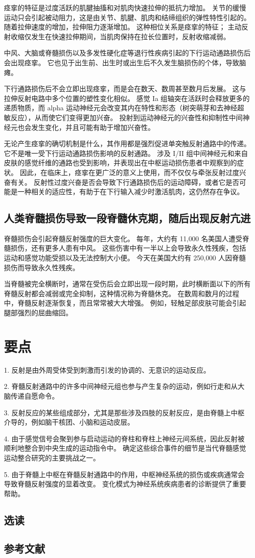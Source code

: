 痉挛的特征是过度活跃的肌腱抽搐和对肌肉快速拉伸的抵抗力增加。 关节的缓慢运动只会引起被动阻力，这是由关节、肌腱、肌肉和结缔组织的弹性特性引起的。 随着拉伸速度的增加，拉伸阻力逐渐增加。 这种相位关系是痉挛的特征； 主动反射收缩仅发生在快速拉伸期间，当肌肉保持在拉长位置时，反射收缩减弱。

中风、大脑或脊髓损伤以及多发性硬化症等退行性疾病引起的下行运动通路损伤后会出现痉挛。 它也见于出生前、出生时或出生后不久发生脑损伤的个体，导致脑瘫。

下行通路损伤后不会立即出现痉挛，而是会在数天、数周甚至数月后发展。 这与拉伸反射电路中多个位置的塑性变化相似。 感觉 Ia 组轴突在活跃时会释放更多的递质物质，而 alpha 运动神经元会改变其内在特性和形态（树突萌芽和去神经超敏反应），从而使它们变得更加兴奋。 投射到运动神经元的兴奋性和抑制性中间神经元也会发生变化，并且可能有助于增加兴奋性。

无论产生痉挛的确切机制是什么，其作用都是强烈促进单突触反射通路中的传递。 它不是唯一受下行运动通路损伤影响的反射通路。 涉及 I/II 组中间神经元和来自皮肤的感觉纤维的通路也受到影响，并表现出在中枢运动损伤患者中观察到的症状。 因此，在临床上，痉挛在更广泛的意义上使用，而不仅仅与牵张反射过度兴奋有关。 反射性过度兴奋是否会导致下行通路损伤后的运动障碍，或者它是否可能是一种相关的适应性，有助于在下行输入减少时激活肌肉，这仍然存在争议。

\subsection{人类脊髓损伤导致一段脊髓休克期，随后出现反射亢进}

脊髓损伤会引起脊髓反射强度的巨大变化。 每年，大约有 11,000 名美国人遭受脊髓损伤，还有更多人患有中风。 这些伤害中有一半以上会导致永久性残疾，包括运动和感觉功能受损以及无法控制大小便。 今天在美国大约有 250,000 人因脊髓损伤而导致永久性残疾。

当脊髓被完全横断时，通常在受伤后会立即出现一段时期，此时横断面以下的所有脊髓反射都会减弱或完全抑制，这种情况称为脊髓休克。 在数周和数月的过程中，脊髓反射逐渐恢复，而且常常被大大增强。 例如，轻触足部皮肤可能会引起腿部强烈的屈曲缩回。


\section{要点}
1. 反射是由外周受体受到刺激而引发的协调的、无意识的运动反应。 

2. 脊髓反射通路中的许多中间神经元组也参与产生复杂的运动，例如行走和从大脑传递自愿命令。 

3. 反射反应的某些组成部分，尤其是那些涉及四肢的反射反应，是由脊髓上中枢介导的，例如脑干核团、小脑和运动皮层。 

4. 由于感觉信号会聚到参与启动运动的脊柱和脊柱上神经元间系统，因此反射被顺利地整合到中央生成的运动指令中。 确定这些综合事件的细节是当代脊髓感觉运动整合研究的主要挑战之一。 

5. 由于脊髓上中枢在脊髓反射通路中的作用，中枢神经系统的损伤或疾病通常会导致脊髓反射强度的显着改变。 变化模式为神经系统疾病患者的诊断提供了重要帮助。

\subsection{选读}
\subsection{参考文献}